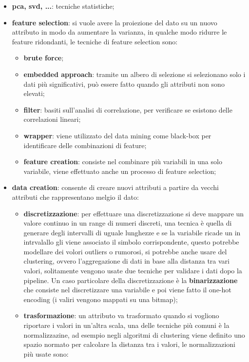 \documentclass[12pt]{article}
\begin{document}
\begin{itemize}
    \item \textbf{pca, svd, ...}: tecniche statistiche;
    \item \textbf{feature selection}: si vuole avere la proiezione del dato su un nuovo attributo in modo da aumentare la varianza, in qualche modo ridurre le feature ridondanti, le tecniche di feature selection sono: 
    \begin{itemize}
        \item \textbf{brute force};
        \item \textbf{embedded approach}: tramite un albero di selezione si selezionano solo i dati pi\`u significativi, pu\`o essere fatto quando gli attributi non sono elevati;
        \item \textbf{filter}: basiti sull'analisi di correlazione, per verificare se esistono delle correlazioni lineari;
        \item \textbf{wrapper}: viene utilizzato del data mining come black-box per identificare delle combinazioni di feature;
        \item \textbf{feature creation}: consiste nel combinare pi\`u variabili in una solo variabile, viene effettuato anche un processo di feature selection;
    \end{itemize}
    \item \textbf{data creation}: consente di creare nuovi attributi a partire da vecchi attributi che rappresentano melgio il dato:
    \begin{itemize}
        \item \textbf{discretizzazione}: per effettuare una discretizzazione si deve mappare un valore continuo in un range di numeri discreti, una tecnica \`e quella di generare degli intervalli di uguale lunghezze e se la variabile ricade un in intrvalallo gli viene associato il simbolo corrispondente, questo potrebbe modellare dei volori outliers o rumorosi, si potrebbe anche usare del clustering, ovvero l'aggregazione di dati in base alla distanza tra vari valori, solitamente vengono usate due tecniche per validare i dati dopo la pipeline. Un caso particolare della discretizzazione \`e la \textbf{binarizzazione} che consiste nel discretizzare una variabile e poi  viene fatto il one-hot encoding (i valiri vengono mappati su una bitmap);
        \item \textbf{trasformazione}: un attributo va trasformato quando si vogliono riportare i valori in un'altra scala, una delle tecniche pi\`u comuni \`e la normalizzazine, ad esempio negli algoritmi di clustering viene definito uno spazio normato per calcolare la distanza tra i valori, le normalizzazioni pi\`u usate sono:

\end{itemize}
\end{itemize}
\end{document}

